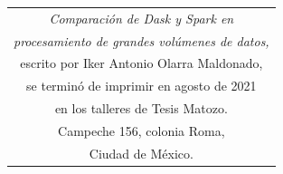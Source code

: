 \documentclass[11pt, oneside]{book}
\begin{document}
\begin{thebibliography}{111}

























\end{thebibliography}

\newpage
\thispagestyle{empty}
\begin{table}[p]
\centering
\small
\label{ed}
\begin{tabular}{c}
\textit{Comparación de Dask y Spark en} \\ \textit{procesamiento de grandes volúmenes de datos,}\\ escrito por Iker Antonio Olarra Maldonado,\\ se terminó de imprimir en agosto de 2021\\ en los talleres de Tesis Matozo.\\ Campeche 156, colonia Roma,\\ Ciudad de México.
\end{tabular}
\end{table}


\end{document}
